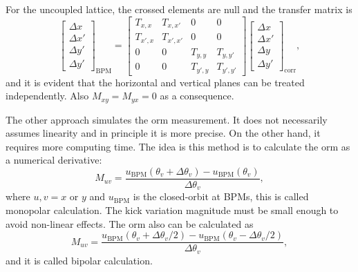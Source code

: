 For the uncoupled lattice, the crossed elements are null and the transfer matrix is
\begin{equation}
    \begin{bmatrix}
    \Delta x \\
    \Delta x' \\
    \Delta y' \\
    \Delta y'
    \end{bmatrix}_{\mathrm{BPM}}  =
    \begin{bmatrix}
    T_{x, x} & T_{x, x'} & 0 & 0  \\
    T_{x', x} & T_{x', x'} & 0 & 0 \\
    0 & 0  & T_{y, y} & T_{y, y'} \\
    0 & 0 & T_{y', y} & T_{y', y'} 
    \end{bmatrix} 
    \begin{bmatrix}
    \Delta x \\
    \Delta x' \\
    \Delta y \\
    \Delta y'
    \end{bmatrix}_{\mathrm{corr}},
\end{equation}
and it is evident that the horizontal and vertical planes can be treated independently. Also $M_{xy} = M_{yx} = 0$ as a consequence.

The other approach simulates the \gls{orm} measurement. It does not necessarily assumes linearity and in principle it is more precise. On the other hand, it requires more computing time. The idea is this method is to calculate the \gls{orm} as a numerical derivative:
\begin{equation}
    M_{uv} = \dfrac{u_{\mathrm{BPM}}\left(\theta_v + \Delta \theta_v\right)-u_{\mathrm{BPM}}\left(\theta_v \right)}{\Delta \theta_v},
    \label{eq:unipolar_respm}
\end{equation}
where $u, v = x$ or $y$ and $u_{\mathrm{BPM}}$ is the closed-orbit at BPMs, this is called monopolar calculation. The kick variation magnitude must be small enough to avoid non-linear effects. The \gls{orm} also can be calculated as
\begin{equation}
    M_{uv} = \dfrac{u_{\mathrm{BPM}}\left(\theta_v + \Delta \theta_v/2\right)-u_{\mathrm{BPM}}\left(\theta_v- \Delta \theta_v/2\right)}{\Delta \theta_v},
    \label{eq:bipolar_respm}
\end{equation}
and it is called bipolar calculation.

